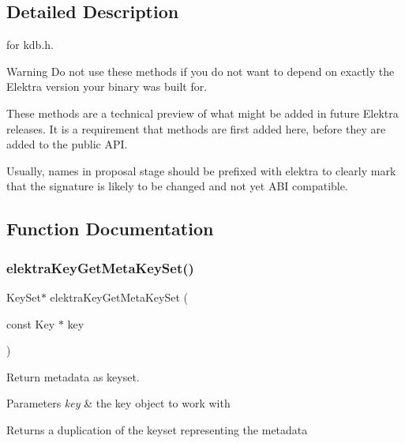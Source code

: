 \subsection{Detailed Description}
for kdb.\+h. 

\begin{DoxyWarning}{Warning}
Do not use these methods if you do not want to depend on exactly the Elektra version your binary was built for.
\end{DoxyWarning}
These methods are a technical preview of what might be added in future Elektra releases. It is a requirement that methods are first added here, before they are added to the public A\+PI.

Usually, names in proposal stage should be prefixed with elektra to clearly mark that the signature is likely to be changed and not yet A\+BI compatible. 

\subsection{Function Documentation}
\mbox{\label{group__api_ga48120f254e09e0c5cceff4864f110ceb}} 
\subsubsection{\texorpdfstring{elektra\+Key\+Get\+Meta\+Key\+Set()}{elektraKeyGetMetaKeySet()}}
{\footnotesize\ttfamily Key\+Set$\ast$ elektra\+Key\+Get\+Meta\+Key\+Set (\begin{DoxyParamCaption}\item[{const Key $\ast$}]{key }\end{DoxyParamCaption})}



Return metadata as keyset. 


\begin{DoxyParams}{Parameters}
{\em key} & the key object to work with\\
\hline
\end{DoxyParams}
\begin{DoxyReturn}{Returns}
a duplication of the keyset representing the metadata 
\end{DoxyReturn}
\mbox{\label{group__api_ga812eb6c4f506dafa5733bf531c52199c}} 
